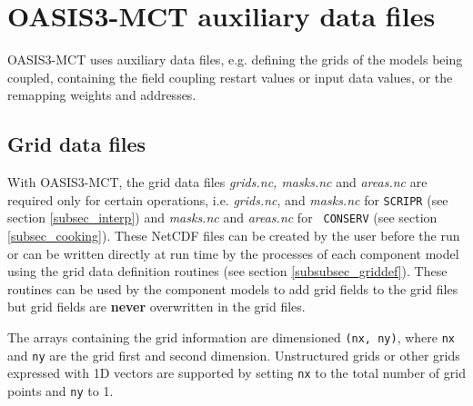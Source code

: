 \newpage
\chapter{OASIS3-MCT auxiliary data files}
\label{sec_auxiliary}

OASIS3-MCT uses auxiliary data files, e.g. defining the
grids of the models being coupled, containing the field coupling
restart values or input data values, or the remapping weights and
addresses.

\section{Grid data files}
\label{subsec_griddata}

With OASIS3-MCT, the grid data files {\em grids.nc, masks.nc} and {\em
  areas.nc} are required only for certain operations, i.e.  {\em
  grids.nc}, and {\em masks.nc} for {\tt SCRIPR} (see section
\ref{subsec_interp}) and {\em masks.nc} and {\em areas.nc} for {\tt
  CONSERV} (see section \ref{subsec_cooking}). These NetCDF files can
be created by the user before the run or can be written directly at
run time by the processes of each component model using the grid
data definition routines (see section \ref{subsubsec_griddef}).  These
routines can be used by the component models to add grid fields to the
grid files but grid fields are {\bf never} overwritten in the grid
files.

The arrays containing the grid information are dimensioned {\tt (nx,
  ny)}, where {\tt nx} and {\tt ny} are the grid first and second
dimension.  Unstructured grids or other grids expressed with 1D
vectors are supported by setting {\tt nx} to the total number of grid
points and {\tt ny} to 1.

